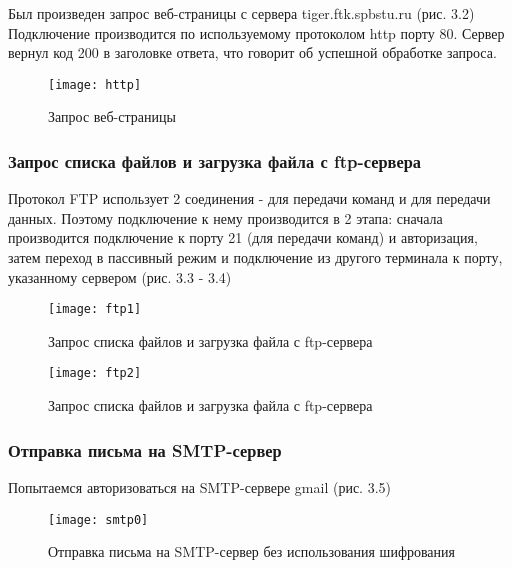 Был произведен запрос веб-страницы с сервера tiger.ftk.spbstu.ru (рис. 3.2) Подключение производится по используемому протоколом http порту 80. Сервер вернул код 200 в заголовке ответа, что говорит об успешной обработке запроса.

\begin{figure}[H]
	\begin{center}
		\texttt{[image: http]}
		\caption{Запрос веб-страницы} 
		\label{pic:pic_name} %
	\end{center}
\end{figure}

\subsubsection{Запрос списка файлов и загрузка файла с ftp-сервера}

Протокол FTP использует 2 соединения - для передачи команд и для передачи данных. Поэтому подключение к нему производится в 2 этапа: сначала производится подключение к порту 21 (для передачи команд) и авторизация, затем переход в пассивный режим и подключение из другого терминала к порту, указанному сервером (рис. 3.3 - 3.4)

\begin{figure}[H]
	\begin{center}
		\texttt{[image: ftp1]}
		\caption{Запрос списка файлов и загрузка файла с ftp-сервера} 
		\label{pic:pic_name} %
	\end{center}
\end{figure}

\begin{figure}[H]
	\begin{center}
		\texttt{[image: ftp2]}
		\caption{Запрос списка файлов и загрузка файла с ftp-сервера} 
		\label{pic:pic_name} %
	\end{center}
\end{figure}

\subsubsection{Отправка письма на SMTP-сервер}

Попытаемся авторизоваться на SMTP-сервере gmail  (рис. 3.5)

\begin{figure}[H]
	\begin{center}
		\texttt{[image: smtp0]}
		\caption{Отправка письма на SMTP-сервер без использования шифрования} 
		\label{pic:pic_name} %
	\end{center}
\end{figure}

